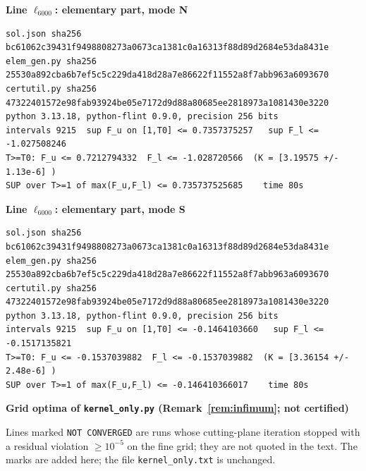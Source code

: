 \documentclass[11pt,reqno]{amsart}
\numberwithin{equation}{section}
\theoremstyle{definition}
\theoremstyle{remark}
\newcommand{\appsub}[1]{\par\medskip\noindent\textbf{#1}\par\nobreak\smallskip}
\begin{document}
\appsub{Line $\ell_{6000}$: elementary part, mode N}
\begin{lstlisting}
sol.json sha256 bc61062c39431f9498808273a0673ca1381c0a16313f88d89d2684e53da8431e
elem_gen.py sha256 25530a892cba6b7ef5c5c229da418d28a7e86622f11552a8f7abb963a6093670
certutil.py sha256 47322401572e98fab93924be05e7172d9d88a80685ee2818973a1081430e3220
python 3.13.18, python-flint 0.9.0, precision 256 bits
intervals 9215  sup F_u on [1,T0] <= 0.7357375257   sup F_l <= -1.027508246
T>=T0: F_u <= 0.7212794332  F_l <= -1.028720566  (K = [3.19575 +/- 1.13e-6] )
SUP over T>=1 of max(F_u,F_l) <= 0.735737525685    time 80s
\end{lstlisting}
\appsub{Line $\ell_{6000}$: elementary part, mode S}
\begin{lstlisting}
sol.json sha256 bc61062c39431f9498808273a0673ca1381c0a16313f88d89d2684e53da8431e
elem_gen.py sha256 25530a892cba6b7ef5c5c229da418d28a7e86622f11552a8f7abb963a6093670
certutil.py sha256 47322401572e98fab93924be05e7172d9d88a80685ee2818973a1081430e3220
python 3.13.18, python-flint 0.9.0, precision 256 bits
intervals 9215  sup F_u on [1,T0] <= -0.1464103660   sup F_l <= -0.1517135821
T>=T0: F_u <= -0.1537039882  F_l <= -0.1537039882  (K = [3.36154 +/- 2.48e-6] )
SUP over T>=1 of max(F_u,F_l) <= -0.146410366017    time 80s
\end{lstlisting}
\appsub{Grid optima of \texttt{kernel\_only.py} (Remark~\ref{rem:infimum}; not certified)}\label{app:out_kernel_only}
Lines marked \texttt{NOT CONVERGED} are runs whose cutting-plane iteration stopped with a residual violation $\ge10^{-5}$ on the fine grid; they are not quoted in the text. The marks are added here; the file \texttt{kernel\_only.txt} is unchanged.
\end{document}
